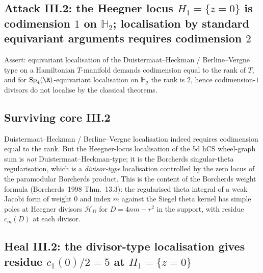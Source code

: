 \subsection*{Attack III.2: the Heegner locus $H_1 = \{z = 0\}$ is
codimension $1$ on $\mathbb{H}_2$; localisation by standard equivariant
arguments requires codimension $2$}

Assert: equivariant localisation of the Duistermaat--Heckman /
Berline--Vergne type on a Hamiltonian $T$-manifold demands codimension
equal to the rank of $T$, and for $\mathrm{Sp}_4(\R)$-equivariant
localisation on $\mathbb{H}_2$ the rank is $2$, hence codimension-$1$
divisors do not localise by the classical theorems.

\subsection*{Surviving core III.2}

Duistermaat--Heckman / Berline--Vergne localisation indeed requires
codimension equal to the rank. But the Heegner-locus localisation of
the 5d hCS wheel-graph sum is \emph{not} Duistermaat--Heckman-type;
it is the Borcherds singular-theta regularisation, which is a
\emph{divisor-type} localisation controlled by the zero locus of the
paramodular Borcherds product. This is the content of the Borcherds
weight formula (Borcherds~1998 Thm.~13.3): the regularised theta integral
of a weak Jacobi form of weight $0$ and index $m$ against the Siegel
theta kernel has simple poles at Heegner divisors $\mathcal{H}_D$ for
$D = 4nm - r^2$ in the support, with residue
$c_m(D)$ at each divisor.

\subsection*{Heal III.2: the divisor-type localisation gives residue
$c_1(0)/2 = 5$ at $H_1 = \{z=0\}$}

